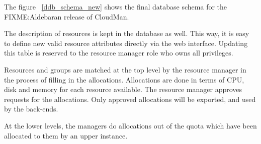 The figure ~\ref{ddb_schema_new} shows the final database schema for the FIXME:Aldebaran release of CloudMan.


The description of resources is kept in the database as well. This way, it is easy to define new valid resource attributes directly via the web interface. Updating this table is reserved to the resource manager role who owns all privileges. 

Resources and groups are matched at the top level by the resource manager in the process of filling in the allocations. Allocations are done in terms of CPU, disk and memory for each resource available. 
The resource manager approves requests for the allocations. Only approved allocations will be exported, 
and used by the back-ends.

At the lower levels, the managers do allocations out of the quota which have been allocated to them by an upper instance. 



